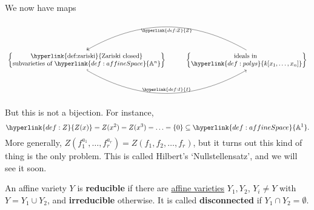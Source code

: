 \documentclass{article}
\newcommand{\A}{\mathbb{A}}
\begin{document}
We now have maps
\begin{equation*}
    \begin{tikzcd}
    \begin{Bmatrix}
        \text{\hyperlink{def:zariski}{Zariski closed}} \\
        \text{subvarieties of } \hyperlink{def:affineSpace}{\A^n}
    \end{Bmatrix}
    \ar[r, bend right, hookrightarrow, "\hyperlink{def:I}{I}", start anchor=south, end anchor=south]&
    \begin{Bmatrix}
        \text{ideals in } \\
        \hyperlink{def:polys}{k[x_1, \dotsc, x_n]}
    \end{Bmatrix}
    \ar[l, bend right, two heads, "\hyperlink{def:Z}{Z}", start anchor=north, end anchor=north]
\end{tikzcd}
\end{equation*}
But this is not a bijection. For instance,
\begin{equation*}\hyperlink{def:Z}{Z(x)} = Z(x^2) = Z(x^3) = \dotsc = \{0\} \subseteq \hyperlink{def:affineSpace}{\A^1}.\end{equation*}
More generally,
$Z( f_1^{a_1}, \dotsc, f_r^{a_r}) = Z(f_1, f_2, \dotsc, f_r)$,
but it turns out this kind of thing is the only problem.
This is called Hilbert's `Nullstellensatz', and we will see it soon.
\begin{defi}[Reducible]
    An affine variety $Y$ is \textbf{reducible} if there are \hyperlink{def:Z}{affine varieties} $Y_1, Y_2$, $Y_i \neq Y$ with $Y = Y_1 \cup Y_2$, and \textbf{irreducible} otherwise. It is called \textbf{disconnected} if $Y_1 \cap Y_2 = \emptyset$.
\end{defi}

\color{gray}
\end{document}
